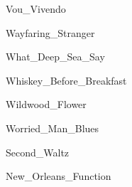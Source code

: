 \documentclass{article}
\begin{document}

{Vou_Vivendo}


{Wayfaring_Stranger}


{What_Deep_Sea_Say}


{Whiskey_Before_Breakfast}


{Wildwood_Flower}


{Worried_Man_Blues}


{Second_Waltz}


{New_Orleans_Function}
\end{document}
